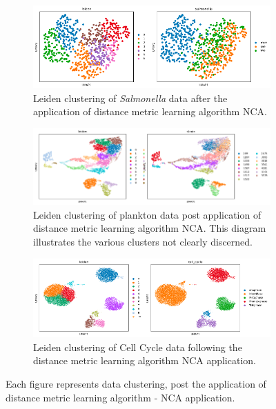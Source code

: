 \documentclass[12pt,a4paper]{article}
\begin{document}
\begin{figure}
  \centering
  \begin{subfigure}{\linewidth}
    \includegraphics[width=\linewidth]{Figures/salmonellaclustering_afternca.png}
    \caption{Leiden clustering of \textit{Salmonella} data after the application of distance metric learning algorithm NCA.}
    \label{multifig4:image_a}
  \end{subfigure}
  \hfill
  \begin{subfigure}{\linewidth}
    \includegraphics[width=\linewidth]{Figures/planktonclustering_afternca.png}
    \caption{Leiden clustering of plankton data post application of distance metric learning algorithm NCA. This diagram illustrates the various clusters not clearly discerned.}
    \label{multifig4:image_b}
  \end{subfigure}
  \hfill
  \begin{subfigure}{\linewidth}
    \includegraphics[width=\linewidth]{Figures/cellcycleclustering_afternca.png}
    \caption{Leiden clustering of Cell Cycle data following the distance metric learning algorithm NCA application.}
    \label{multifig4:image_c}
  \end{subfigure}
  \caption{Each figure represents data clustering, post the application of distance metric learning algorithm - NCA application.}
  \label{multifig4:DML_Clusters}
\end{figure}
\end{document}
